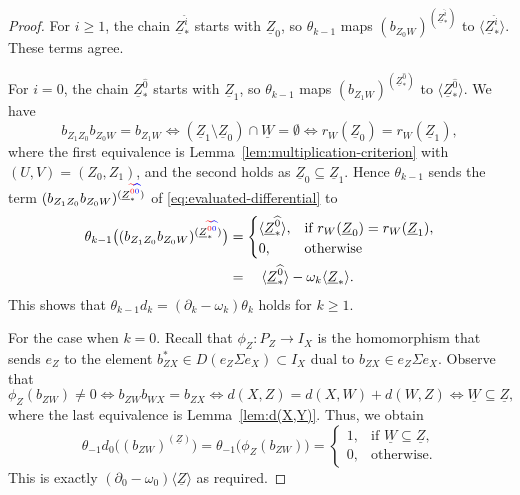 \documentclass[a4paper,leqno]{amsart}
\begin{document}
{\begin{proof}
For $i\geq1$, the chain $\underline{Z}_\ast^{\widehat{i}}$ starts with $\underline{Z}_0$, so $\theta_{k-1}$ maps $(b_{Z_0W})^{(\underline{Z}_\ast^{\widehat{i}})}$ to $\langle\underline{Z}_\ast^{\widehat{i}}\rangle$. These terms agree.

For $i=0$, the chain $\underline{Z}_\ast^{\widehat{0}}$ starts with $\underline{Z}_1$, so $\theta_{k-1}$ maps $(b_{Z_1W})^{(\underline{Z}_\ast^{\widehat{0}})}$ to $\langle\underline{Z}_\ast^{\widehat{0}}\rangle$. 
We have
\[
 b_{Z_1Z_0}b_{Z_0W}=b_{Z_1W}
 \iff(\underline{Z}_1\setminus\underline{Z}_0)\cap\underline{W}=\emptyset
 \iff r_W(\underline{Z}_0)=r_W(\underline{Z}_1),
\]
where the first equivalence is Lemma~\ref{lem:multiplication-criterion} with $(U,V)=(Z_0,Z_1)$, and the second holds as $\underline{Z}_0\subseteq\underline{Z}_1$. Hence $\theta_{k-1}$ sends the term $(b_{Z_1Z_0}b_{Z_0W})^{(\underline{Z}_\ast^{\old{\widetilde{0}}\new{\widehat{0}}})}$ of \eqref{eq:evaluated-differential} to
\begin{align*}
\theta_{k-1}\big( (b_{Z_1Z_0}b_{Z_0W})^{(\underline{Z}_\ast^{\old{\widetilde{0}}\new{\widehat{0}}})} \big) &= \begin{cases}
 \langle\underline{Z}_\ast^{\widehat{0}}\rangle, & \text{if }r_W(\underline{Z}_0)=r_W(\underline{Z}_1),\\
 0, & \text{otherwise}
 \end{cases}
 \\
 &=\quad
 \langle\underline{Z}_\ast^{\widehat{0}}\rangle-\omega_k\langle\underline{Z}_\ast\rangle.
\end{align*}
This shows that $\theta_{k-1}d_k=(\partial_k-\omega_k)\theta_k$ holds for $k\ge 1$.

For the case when $k=0$. Recall that $\phi_Z:P_Z\to I_X$ is the homomorphism that sends $e_Z$ to the element $b_{ZX}^*\in D(e_Z \Sigma e_X )\subset I_X$ dual to $b_{ZX}\in e_Z \Sigma e_X$.  Observe that
\[
 \phi_Z(b_{ZW})\neq0
 \iff b_{ZW}b_{WX}=b_{ZX}
 \iff d(X,Z)=d(X,W)+d(W,Z)
 \iff \underline{W}\subseteq\underline{Z},
\]
where the last equivalence is Lemma~\ref{lem:d(X,Y)}.
Thus, we obtain 
\[
\theta_{-1}d_0\bigl((b_{ZW})^{(\underline{Z})}\bigr) = \theta_{-1}\big(\phi_Z(b_{ZW})\big) = \begin{cases}
    1, &\text{if }\underline{W}\subseteq\underline{Z},\\
    0, &\text{otherwise}.
\end{cases}
\]
This is exactly $(\partial_0-\omega_0)\langle\underline{Z}\rangle$ as required.
\end{proof}}
\end{document}
